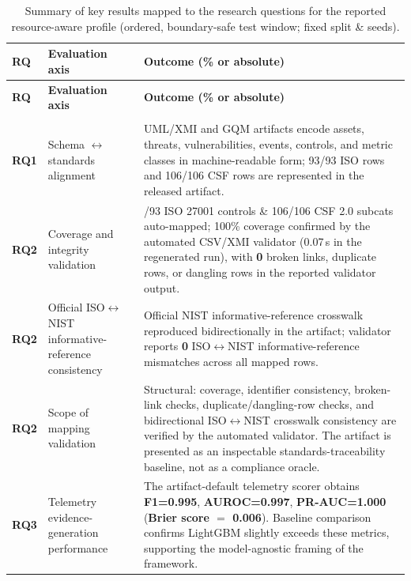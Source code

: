 \documentclass[preprint,12pt]{elsarticle}
\def\textsubscript#1{#1}%
\begin{document}
\begingroup
\small
\setlength{\tabcolsep}{3pt}
\begin{longtable}{>{\raggedright\arraybackslash}p{1.0cm}>{\raggedright\arraybackslash}p{2.7cm}>{\raggedright\arraybackslash}p{8.9cm}}
\caption{Summary of key results mapped to the research questions for the reported resource-aware profile (ordered, boundary-safe test window; fixed split \& seeds).}
\label{tab:rq-summary}\\
\toprule
\textbf{RQ} & \textbf{Evaluation axis} & \textbf{Outcome (\% or absolute)}\\
\midrule
\endfirsthead
\toprule
\textbf{RQ} & \textbf{Evaluation axis} & \textbf{Outcome (\% or absolute)}\\
\midrule
\endhead
\midrule
\multicolumn{3}{r}{Continued on next page}\\
\endfoot
\bottomrule
\endlastfoot
\textbf{RQ1} & Schema $\leftrightarrow$ standards alignment
& UML/XMI and GQM artifacts encode assets, threats, vulnerabilities, events, controls, and metric classes in machine-readable form; 93/93 ISO rows and 106/106 CSF rows are represented in the released artifact.\\
\textbf{RQ2} & Coverage and integrity validation
& 93/93 ISO 27001 controls \& 106/106 CSF 2.0 subcats auto-mapped; 100\% coverage confirmed by the automated CSV/XMI validator (0.07\,s in the regenerated run), with \textbf{0} broken links, duplicate rows, or dangling rows in the reported validator output.\\
\textbf{RQ2} & Official ISO$\leftrightarrow$NIST informative-reference consistency
& Official NIST informative-reference crosswalk reproduced bidirectionally in the artifact; validator reports \textbf{0} ISO$\leftrightarrow$NIST informative-reference mismatches across all mapped rows.\\
\textbf{RQ2} & Scope of mapping validation
& Structural: coverage, identifier consistency, broken-link checks, duplicate/dangling-row checks, and bidirectional ISO$\leftrightarrow$NIST crosswalk consistency are verified by the automated validator. The artifact is presented as an inspectable standards-traceability baseline, not as a compliance oracle.\\
\textbf{RQ3} & Telemetry evidence-generation performance
& The artifact-default telemetry scorer obtains \textbf{F\textsubscript{1}=0.995}, \textbf{AUROC=0.997}, \textbf{PR-AUC=1.000} (\textbf{Brier score $=$ 0.006}). Baseline comparison confirms LightGBM slightly exceeds these metrics, supporting the model-agnostic framing of the framework.\\

\end{longtable}
\end{document}
